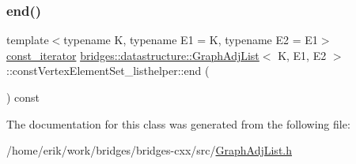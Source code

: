 \mbox{\label{classbridges_1_1datastructure_1_1_graph_adj_list_1_1const_vertex_element_set__listhelper_a836477771db915bc417ab9f2811ac7c2}} 
\subsubsection{\texorpdfstring{end()}{end()}}
{\footnotesize\ttfamily template$<$typename K, typename E1 = K, typename E2 = E1$>$ \\
\hyperlink{classbridges_1_1datastructure_1_1_graph_adj_list_1_1const_vertex_element_set__listhelper_1_1const__iterator}{const\+\_\+iterator} \hyperlink{classbridges_1_1datastructure_1_1_graph_adj_list}{bridges\+::datastructure\+::\+Graph\+Adj\+List}$<$ K, E1, E2 $>$\+::const\+Vertex\+Element\+Set\+\_\+listhelper\+::end (\begin{DoxyParamCaption}{ }\end{DoxyParamCaption}) const\hspace{0.3cm}{\ttfamily [inline]}}



The documentation for this class was generated from the following file\+:\begin{DoxyCompactItemize}
\item 
/home/erik/work/bridges/bridges-\/cxx/src/\hyperlink{_graph_adj_list_8h}{Graph\+Adj\+List.\+h}\end{DoxyCompactItemize}
